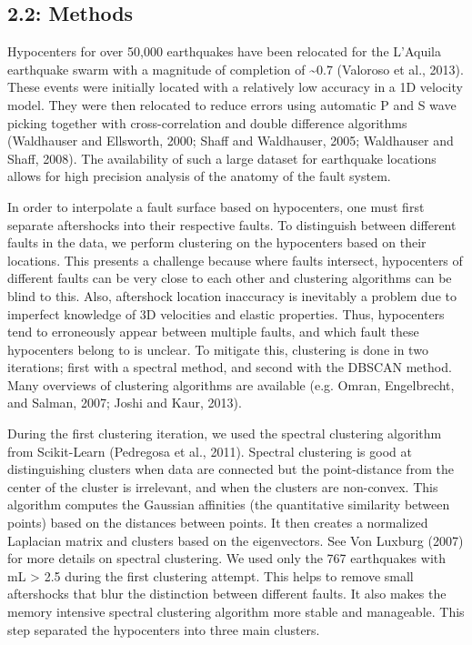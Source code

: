 \documentclass[11pt]{article}
\begin{document}
    \subsection{2.2: Methods}\label{methods}

    Hypocenters for over 50,000 earthquakes have been relocated for the
L'Aquila earthquake swarm with a magnitude of completion of
\textasciitilde{}0.7 (Valoroso et al., 2013). These events were
initially located with a relatively low accuracy in a 1D velocity model.
They were then relocated to reduce errors using automatic P and S wave
picking together with cross-correlation and double difference algorithms
(Waldhauser and Ellsworth, 2000; Shaff and Waldhauser, 2005; Waldhauser
and Shaff, 2008). The availability of such a large dataset for
earthquake locations allows for high precision analysis of the anatomy
of the fault system.

In order to interpolate a fault surface based on hypocenters, one must
first separate aftershocks into their respective faults. To distinguish
between different faults in the data, we perform clustering on the
hypocenters based on their locations. This presents a challenge because
where faults intersect, hypocenters of different faults can be very
close to each other and clustering algorithms can be blind to this.
Also, aftershock location inaccuracy is inevitably a problem due to
imperfect knowledge of 3D velocities and elastic properties. Thus,
hypocenters tend to erroneously appear between multiple faults, and
which fault these hypocenters belong to is unclear. To mitigate this,
clustering is done in two iterations; first with a spectral method, and
second with the DBSCAN method. Many overviews of clustering algorithms
are available (e.g. Omran, Engelbrecht, and Salman, 2007; Joshi and
Kaur, 2013).

    During the first clustering iteration, we used the spectral clustering
algorithm from Scikit-Learn (Pedregosa et al., 2011). Spectral
clustering is good at distinguishing clusters when data are connected
but the point-distance from the center of the cluster is irrelevant, and
when the clusters are non-convex. This algorithm computes the Gaussian
affinities (the quantitative similarity between points) based on the
distances between points. It then creates a normalized Laplacian matrix
and clusters based on the eigenvectors. See Von Luxburg (2007) for more
details on spectral clustering. We used only the 767 earthquakes with mL
\textgreater{} 2.5 during the first clustering attempt. This helps to
remove small aftershocks that blur the distinction between different
faults. It also makes the memory intensive spectral clustering algorithm
more stable and manageable. This step separated the hypocenters into
three main clusters.
\end{document}
